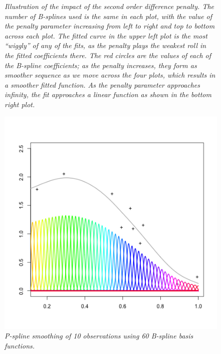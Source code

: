 \begin{figure}[H]
\begin{subfigure}{.5\textwidth}
  \label{fig:pspline_small_lambda}
\end{subfigure}
\caption{\textit{Illustration of the impact of the second order difference penalty. The number of B-splines used is the same in each plot, with the value of the penalty parameter increasing from left to right and top to bottom across each plot. The fitted curve in the upper left plot is the most ``wiggly'' of any of the fits, as the penalty plays the weakest roll in the fitted coefficients there. The red circles are the values of each of the B-spline coefficients; as the penalty increases, they form as smoother sequence as we move across the four plots, which results in a smoother fitted function. As the penalty parameter approaches infinity, the fit approaches a linear function as shown in the bottom right plot.}}
\label{fig:increasing-lambda-pspline-fits}
\end{figure}

\begin{figure}[H] 
\centering
\graphicspath{{img/}}
\includegraphics[scale=0.75]{pspline_10obs_60_basis_functions.png}
\caption{\textit{P-spline smoothing of 10 observations using 60 B-spline basis functions.}} \label{fig:overcomplete-pspline-basis}
\end{figure}

